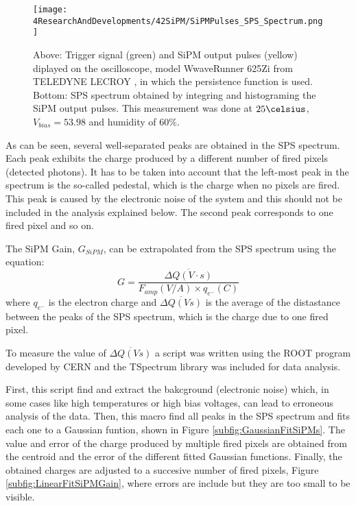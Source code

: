 \begin{figure}[hbtp]
\centering
\texttt{[image: 4ResearchAndDevelopments/42SiPM/SiPMPulses\_SPS\_Spectrum.png]}
\caption{Above: Trigger signal (green) and SiPM output pulses (yellow) diplayed on the oscilloscope, model WwaveRunner 625Zi from TELEDYNE LECROY \cite{OscilloscopeIFIMED}, in which the persistence function is used. Bottom: SPS spectrum obtained by integring and histograming the SiPM output pulses. This measurement was done at $25\celsius$, $V_{bias}=53.98$ and humidity of $60\%$. \label{fig:OutputPulses_SPSspectrum}}
\end{figure}

As can be seen, several well-separated peaks are obtained in the SPS spectrum. Each peak exhibits the charge produced by a different number of fired pixels (detected photons). It has to be taken into account that the left-most peak in the spectrum is the so-called pedestal, which is the charge when no pixels are fired. This peak is caused by the electronic noise of the system and this should not be included in the analysis explained below. The second peak corresponds to one fired pixel and so on.

The SiPM Gain, $G_{SiPM}$, can be extrapolated from the SPS spectrum using the equation:
\begin{equation}
G=\frac{\overline{\Delta Q (V \cdot{} s)}}{F_{amp}(V/A) \times q_{e^-}(C)}
\label{SiPMGain}
\end{equation}
where $q_{e^-}$ is the electron charge and $\overline{\Delta Q (Vs)}$ is the average of the distastance between the peaks of the SPS spectrum, which is the charge due to one fired pixel. 

To measure the value of $\overline{\Delta Q (Vs)}$ a script was written using the ROOT program \cite{ROOTWebPage} developed by CERN and the TSpectrum library was included for data analysis. 

First, this script find and extract the bakcground (electronic noise) which, in some cases like high temperatures or high bias voltages, can lead to erroneous analysis of the data. Then, this macro find all peaks in the SPS spectrum and fits each one to a Gaussian funtion, shown in Figure \ref{subfig:GaussianFitSiPMs}. The value and error of the charge produced by multiple fired pixels are obtained from the centroid and the error of the different fitted Gaussian functions. Finally, the obtained charges are adjusted to a succesive number of fired pixels, Figure \ref{subfig:LinearFitSiPMGain}, where errors are include but they are too small to be visible.

